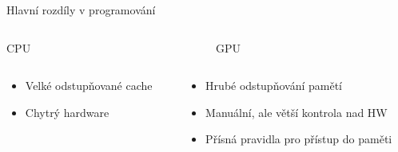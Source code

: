 \documentclass[compress,mathserif]{beamer}
\theoremstyle{definition}
\theoremstyle{plain}
\newcommand{\beI}{\begin{itemize}}
\newcommand{\enI}{\end{itemize}}
\begin{document}
    \begin{frame}{Hlavní rozdíly v programování}

    \begin{minipage}{\textwidth}
        \begin{columns}
        \begin{column}{0.4\textwidth}
            \begin{center}
                CPU
            \end{center}
        \end{column}
        \begin{column}{0.6\textwidth}
            \begin{center}
                GPU
            \end{center}
        \end{column}
        \end{columns}
    \end{minipage}
    
    \begin{minipage}{\textwidth}
        \begin{columns}
        \begin{column}{0.4\textwidth}
            \begin{center}
                \beI
                    \item Velké odstupňované cache
                    \item Chytrý hardware
                \enI
            \end{center}
        \end{column}
        \begin{column}{0.6\textwidth}
            \begin{center}
                \beI
                    \item Hrubé odstupňování pamětí
                    \item Manuální, ale větší kontrola nad HW
                    \item Přísná pravidla pro přístup do paměti
                \enI
            \end{center}
        \end{column}
        \end{columns}
    \end{minipage}
    

\end{frame}
\end{document}
